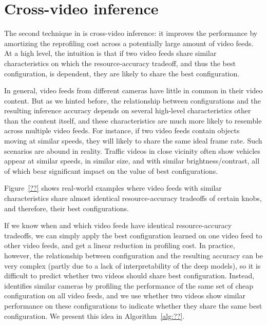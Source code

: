 \section{Cross-video inference}
\label{sec:cross}

The second technique in \name is cross-video inference: 
it improves the performance by amortizing the reprofiling cost across a 
potentially large amount of video feeds.
At a high level, the intuition is that if two video feeds share similar 
characteristics on which the resource-accuracy tradeoff, and thus the best 
configuration, is dependent, they are likely to share the best configuration.

In general, video feeds from different cameras have little in common in their
video content. 
But as we hinted before, the relationship between configurations and the 
resulting inference accuracy depends on several high-level characteristics 
other than the content itself, and these characteristics are much more likely
to resemble across multiple video feeds. 
For instance, if two video feeds contain objects moving at similar speeds,
they will likely to share the same ideal frame rate. 
Such scenarios are abound in reality. 
Traffic videos in close vicinity often show vehicles appear at similar 
speeds, in similar size, and with similar brightness/contrast, all of which
bear significant impact on the value of best configurations.

Figure~\ref{??} shows real-world examples where video feeds with similar 
characteristics share almost identical resource-accuracy tradeoffs of certain
knobs, and therefore, their best configurations.


If we know when and which video feeds have identical resource-accuracy 
tradeoffs, we can simply apply the best configuration learned on one video
feed to other video feeds, and get a linear reduction in profiling cost. 
In practice, however, the relationship between 
configuration and the resulting accuracy can be very complex (partly due to
a lack of interpretability of the deep \nn models), so it is difficult to 
predict whether two videos should share best configuration.
Instead, \name identifies similar cameras by profiling the performance of 
the same set of cheap configuration on all video feeds, and we use whether 
two videos show similar performance on these configurations to indicate 
whether they share the same best configuration.
We present this idea in Algorithm~\ref{alg:??}. 


